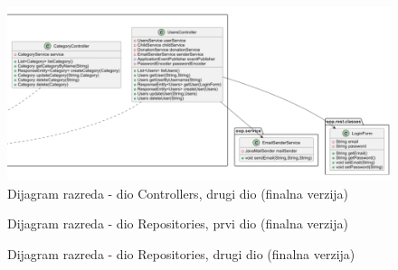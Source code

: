                 \begin{figure}[H]
				\includegraphics[width=\textwidth,height=0.4\textheight]{dijagrami/Controlleri Final Part2.png}
				\centering
				\caption{Dijagram razreda - dio Controllers, drugi dio (finalna verzija)}
				\label{fig:ControllersFinalPt2}
			\end{figure}

                \begin{figure}[H]
				\centering
				\caption{Dijagram razreda - dio Repositories, prvi dio (finalna verzija)}
				\label{fig:RepositoriesFinalPt1}
			\end{figure}

                \begin{figure}[H]
				\centering
				\caption{Dijagram razreda - dio Repositories, drugi dio (finalna verzija)}
				\label{fig:RepositoriesFinalPt2}
			\end{figure}

